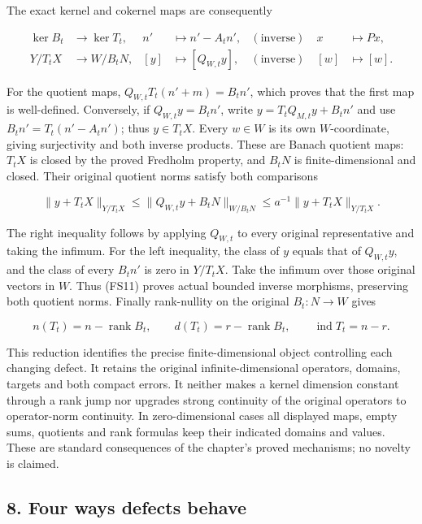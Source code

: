 \documentclass[
  11pt,
]{article}
\begin{document}
The exact kernel and cokernel maps are consequently

\[
 \begin{aligned}
 \ker B_t&\longrightarrow\ker T_t,& n'&\longmapsto n'-A_tn',
 & (\text{inverse})\quad x&\longmapsto Px,\\
 Y/T_tX&\longrightarrow W/B_tN,&[y]&\longmapsto[Q_{W,t}y],
 & (\text{inverse})\quad[w]&\longmapsto[w].
 \end{aligned}                                                \tag{FS11}
\]

For the quotient maps, \(Q_{W,t}T_t(n'+m)=B_tn'\), which proves that the
first map is well-defined. Conversely, if \(Q_{W,t}y=B_tn'\), write
\(y=T_tQ_{M,t}y+B_tn'\) and use \(B_tn'=T_t(n'-A_tn')\); thus
\(y\in T_tX\). Every \(w\in W\) is its own \(W\)-coordinate, giving
surjectivity and both inverse products. These are Banach quotient maps:
\(T_tX\) is closed by the proved Fredholm property, and \(B_tN\) is
finite-dimensional and closed. Their original quotient norms satisfy
both comparisons

\[
 \|y+T_tX\|_{Y/T_tX}
 \leq\|Q_{W,t}y+B_tN\|_{W/B_tN}
 \leq a^{-1}\|y+T_tX\|_{Y/T_tX}.                              \tag{FS12}
\]

The right inequality follows by applying \(Q_{W,t}\) to every original
representative and taking the infimum. For the left inequality, the
class of \(y\) equals that of \(Q_{W,t}y\), and the class of every
\(B_tn'\) is zero in \(Y/T_tX\). Take the infimum over those original
vectors in \(W\). Thus (FS11) proves actual bounded inverse morphisms,
preserving both quotient norms. Finally rank-nullity on the original
\(B_t:N\to W\) gives

\[
 n(T_t)=n-\operatorname{rank}B_t,\qquad
 d(T_t)=r-\operatorname{rank}B_t,\qquad
 \operatorname{ind}T_t=n-r.                                   \tag{FS13}
\]

This reduction identifies the precise finite-dimensional object
controlling each changing defect. It retains the original
infinite-dimensional operators, domains, targets and both compact
errors. It neither makes a kernel dimension constant through a rank jump
nor upgrades strong continuity of the original operators to
operator-norm continuity. In zero-dimensional cases all displayed maps,
empty sums, quotients and rank formulas keep their indicated domains and
values. These are standard consequences of the chapter's proved
mechanisms; no novelty is claimed.

\subsection{8. Four ways defects behave}\label{four-ways-defects-behave}
\end{document}
